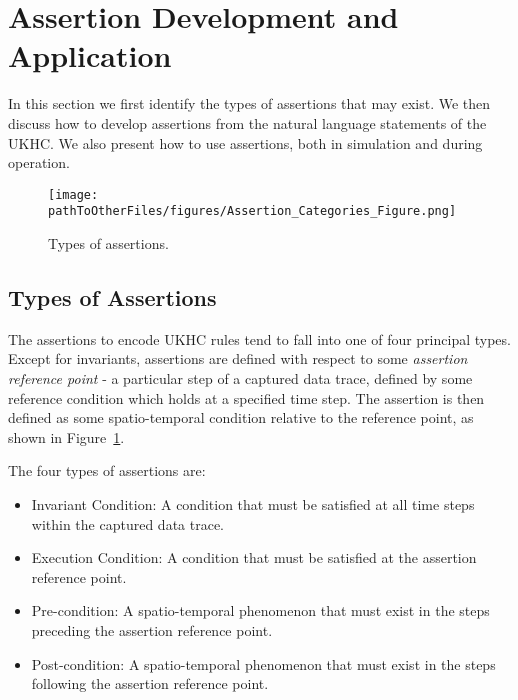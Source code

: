 \section{Assertion Development and Application}\label{Use_of_assertions}
In this section we first identify the types of assertions that may exist. We then discuss how to develop assertions from the natural language statements of the UKHC. We also present how to use assertions, both in simulation and during operation.

\begin{figure}[!b]
    \centering
    \texttt{[image: \\pathToOtherFiles/figures/Assertion\_Categories\_Figure.png]}
    \caption{Types of assertions.}
    \label{fig:categories_of_assertions}
\end{figure}


\subsection{Types of Assertions} \label{assertion_categories}

The assertions to encode UKHC rules tend to fall into one of four principal types. Except for invariants, assertions are defined with respect to some \emph{assertion reference point} - a particular step of a captured data trace, defined by some reference condition which holds at a specified time step. The assertion is then defined as some spatio-temporal condition relative to the reference point, as shown in Figure~\ref{fig:categories_of_assertions}.


The four types of assertions are:
\begin{itemize}
    \item Invariant Condition: A condition that must be satisfied at all time steps within the captured data trace.
    \item Execution Condition: A condition that must be satisfied at the assertion reference point.
    \item Pre-condition: A spatio-temporal phenomenon that must exist in the steps preceding the assertion reference point. 
    \item Post-condition: A spatio-temporal phenomenon that must exist in the steps following the assertion reference point.
\end{itemize}

